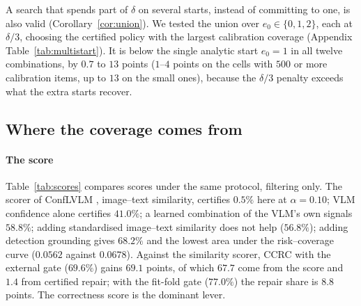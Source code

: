A search that spends part of $\delta$ on several starts, instead of committing to one, is also valid (Corollary~\ref{cor:union}). We tested the union over $e_0\in\{0,1,2\}$, each at $\delta/3$, choosing the certified policy with the largest calibration coverage (Appendix Table~\ref{tab:multistart}). It is below the single analytic start $e_0=1$ in all twelve combinations, by $0.7$ to $13$ points ($1$--$4$ points on the cells with $500$ or more calibration items, up to $13$ on the small ones), because the $\delta/3$ penalty exceeds what the extra starts recover.

\begin{table}[t]
\centering
\caption{Certified coverage (\%) and abort rate (\%) at $\alpha=0.10$ as the start of the fixed sequence varies,
filtering and CCRC with the fit-fold gate (Appendix~\ref{app:ladder} for $\alpha=0.05$ and $0.15$).}
\label{tab:start}
\scriptsize
\resizebox{\textwidth}{!}{}
\end{table}

\subsection{Where the coverage comes from}
\label{sec:score}

\paragraph{The score}
Table~\ref{tab:scores} compares scores under the same protocol, filtering only. The scorer of ConfLVLM \citep{conflvlm},
image--text similarity, certifies $0.5\%$ here at $\alpha=0.10$;
VLM confidence alone certifies $41.0\%$; a learned combination of the VLM's own signals $58.8\%$; adding
standardised image--text similarity does not help ($56.8\%$); adding detection grounding gives $68.2\%$ and the
lowest area under the risk--coverage curve ($0.0562$ against $0.0678$). Against the similarity scorer, CCRC with the external gate ($69.6\%$) gains $69.1$ points, of which $67.7$ come from the score and $1.4$ from certified
repair; with the fit-fold gate ($77.0\%$) the repair share is $8.8$ points. The correctness score is the dominant lever.

\begin{table}[t]
\centering
\caption{POPE-1500, filtering only: certified coverage (\%) with abort rate in parentheses, and area under the
risk--coverage curve at $\alpha=0.10$ (lower is better).}
\label{tab:scores}
\small

\end{table}

